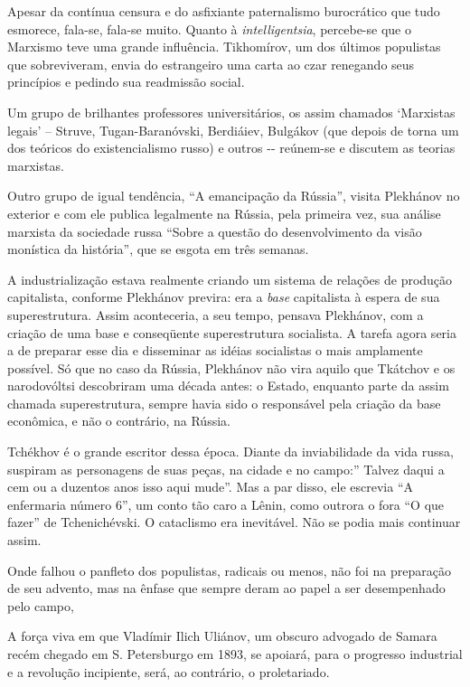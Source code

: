 Apesar da contínua censura e do asfixiante paternalismo burocrático que
tudo esmorece, fala-se, fala-se muito. Quanto à \emph{intelligentsia},
percebe-se que o Marxismo teve uma grande influência. Tikhomírov, um dos
últimos populistas que sobreviveram, envia do estrangeiro uma carta ao
czar renegando seus princípios e pedindo sua readmissão social.

Um grupo de brilhantes professores universitários, os assim chamados
`Marxistas legais' -- Struve, Tugan-Baranóvski, Berdiáiev, Bulgákov (que
depois de torna um dos teóricos do existencialismo russo) e outros -\/-
reúnem-se e discutem as teorias marxistas.

Outro grupo de igual tendência, ``A emancipação da Rússia'', visita
Plekhánov no exterior e com ele publica legalmente na Rússia, pela
primeira vez, sua análise marxista da sociedade russa ``Sobre a questão
do desenvolvimento da visão monística da história'', que se esgota em
três semanas.

A industrialização estava realmente criando um sistema de relações de
produção capitalista, conforme Plekhánov previra: era a \emph{base}
capitalista à espera de sua superestrutura. Assim aconteceria, a seu
tempo, pensava Plekhánov, com a criação de uma base e conseqüente
superestrutura socialista. A tarefa agora seria a de preparar esse dia e
disseminar as idéias socialistas o mais amplamente possível. Só que no
caso da Rússia, Plekhánov não vira aquilo que Tkátchov e os narodovóltsi
descobriram uma década antes: o Estado, enquanto parte da assim chamada
superestrutura, sempre havia sido o responsável pela criação da base
econômica, e não o contrário, na Rússia.

Tchékhov é o grande escritor dessa época. Diante da inviabilidade da
vida russa, suspiram as personagens de suas peças, na cidade e no
campo:'' Talvez daqui a cem ou a duzentos anos isso aqui mude''. Mas a
par disso, ele escrevia ``A enfermaria número 6'', um conto tão caro a
Lênin, como outrora o fora ``O que fazer'' de Tchenichévski. O
cataclismo era inevitável. Não se podia mais continuar assim.

Onde falhou o panfleto dos populistas, radicais ou menos, não foi na
preparação de seu advento, mas na ênfase que sempre deram ao papel a ser
desempenhado pelo campo,

A força viva em que Vladímir Ilich Uliánov, um obscuro advogado de
Samara recém chegado em S. Petersburgo em 1893, se apoiará, para o
progresso industrial e a revolução incipiente, será, ao contrário, o
proletariado.

